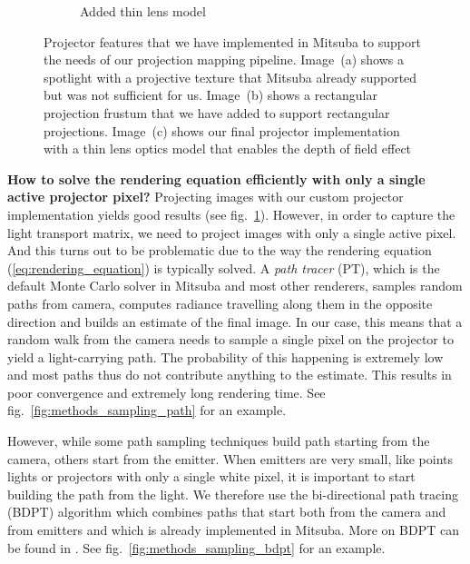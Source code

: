 \begin{figure}[]
\begin{subfigure}[b]{0.32\textwidth}
        \caption{Added thin lens model}
        \vspace*{5mm}
        \label{fig:methods_projector_features_thin_lens}
    \end{subfigure}
    \caption{Projector features that we have implemented in Mitsuba to support the needs of our projection mapping pipeline. Image~(a) shows  a spotlight with a projective texture that Mitsuba already supported but was not sufficient for us. Image~(b) shows a rectangular projection frustum that we have added to support rectangular projections. Image~(c) shows our final projector implementation with a thin lens optics model that enables the depth of field effect}
    \label{fig:methods_projector_features}
\end{figure}

\textbf{How to solve the rendering equation efficiently with only a single active projector pixel?} Projecting images with our custom projector implementation yields good results (see fig.~\ref{fig:methods_projector_features_thin_lens}). However, in order to capture the light transport matrix, we need to project images with only a single active pixel. And this turns out to be problematic due to the way the rendering equation (\ref{eq:rendering_equation}) is typically solved. A \textit{path tracer} (PT), which is the default Monte Carlo solver in Mitsuba and most other renderers, samples random paths from camera, computes radiance travelling along them in the opposite direction and builds an estimate of the final image. In our case, this means that a random walk from the camera needs to sample a single pixel on the projector to yield a light-carrying path. The probability of this happening is extremely low and most paths thus do not contribute anything to the estimate. This results in poor convergence and extremely long rendering time. See fig.~\ref{fig:methods_sampling_path} for an example.

However, while some path sampling techniques build path starting from the camera, others start from the emitter. When emitters are very small, like points lights or projectors with only a single white pixel, it is important to start building the path from the light. We therefore use the bi-directional path tracing (BDPT) algorithm which combines paths that start both from the camera and from emitters and which is already implemented in Mitsuba. More on BDPT can be found in \citet{Veach1997}. See fig.~\ref{fig:methods_sampling_bdpt} for an example.


